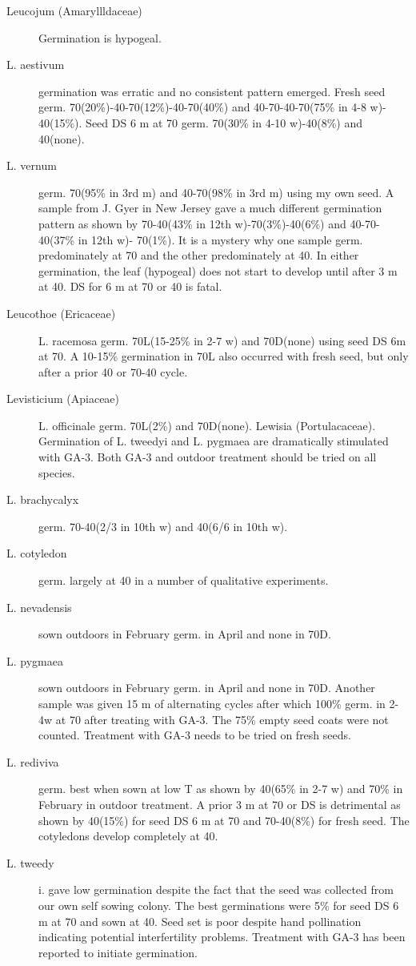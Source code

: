 \begin{description}
\item[Leucojum (Amaryllldaceae)] Germination is hypogeal.
\item[L. aestivum] germination was erratic and no consistent pattern emerged. Fresh
seed germ. 70(20\%)-40-70(12\%)-40-70(40\%) and 40-70-40-70(75\% in 4-8 w)-
40(15\%). Seed DS 6 m at 70 germ. 70(30\% in 4-10 w)-40(8\%) and 40(none).
\item[L. vernum] germ. 70(95\% in 3rd m) and 40-70(98\% in 3rd m) using my own
seed. A sample from J. Gyer in New Jersey gave a much different germination pattern
as shown by 70-40(43\% in 12th w)-70(3\%)-40(6\%) and 40-70-40(37\% in 12th w)-
70(1\%). It is a mystery why one sample germ. predominately at 70 and the other
predominately at 40. In either germination, the leaf (hypogeal) does not start to
develop until after 3 m at 40. DS for 6 m at 70 or 40 is fatal.
\item[Leucothoe (Ericaceae)] L. racemosa germ. 70L(15-25\% in 2-7 w) and
70D(none) using seed DS 6m at 70. A 10-15\% germination in 70L also occurred
with fresh seed, but only after a prior 40 or 70-40 cycle.
\item[Levisticium (Apiaceae)] L. officinale germ. 70L(2\%) and 70D(none).
Lewisia (Portulacaceae). Germination of L. tweedyi and L. pygmaea are
dramatically stimulated with GA-3. Both GA-3 and outdoor treatment should be tried
on all species.
\item[L. brachycalyx] germ. 70-40(2/3 in 10th w) and 40(6/6 in 10th w).
\item[L. cotyledon] germ. largely at 40 in a number of qualitative experiments.
\item[L. nevadensis] sown outdoors in February germ. in April and none in 70D.
\item[L. pygmaea] sown outdoors in February germ. in April and none in 70D.
Another sample was given 15 m of alternating cycles after which 100\% germ. in 2-4w
at 70 after treating with GA-3. The 75\% empty seed coats were not counted. Treatment
with GA-3 needs to be tried on fresh seeds.
\item[L. rediviva] germ. best when sown at low T as shown by 40(65\% in 2-7 w) and
70\% in February in outdoor treatment. A prior 3 m at 70 or DS is detrimental as shown
by 40(15\%) for seed DS 6 m at 70 and 70-40(8\%) for fresh seed. The cotyledons
develop completely at 40.
\item[L. tweedy]i. gave low germination despite the fact that the seed was collected
from our own self sowing colony. The best germinations were 5\% for seed DS 6 m at
70 and sown at 40. Seed set is poor despite hand pollination indicating potential
interfertility problems. Treatment with GA-3 has been reported to initiate germination.


\end{description}
